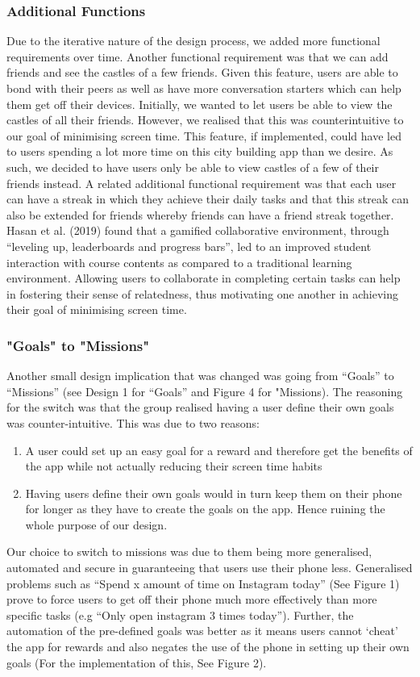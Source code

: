 \documentclass[sigconf, 11pt]{acmart}
\begin{document}
\subsubsection{Additional Functions}
Due to the iterative nature of the design process, we added more functional requirements over time. Another functional requirement was that we can add friends and see the castles of a few friends. Given this feature, users are able to bond with their peers as well as have more conversation starters which can help them get off their devices. Initially, we wanted to let users be able to view the castles of all their friends. However, we realised that this was counterintuitive to our goal of minimising screen time. This feature, if implemented, could have led to users spending a lot more time on this city building app than we desire. As such, we decided to have users only be able to view castles of a few of their friends instead. A related additional functional requirement was that each user can have a streak in which they achieve their daily tasks and that this streak can also be extended for friends whereby friends can have a friend streak together. Hasan et al. (2019) found that a gamified collaborative environment, through “leveling up, leaderboards and progress bars”, led to an improved student interaction with course contents as compared to a traditional learning environment. Allowing users to collaborate in completing certain tasks can help in fostering their sense of relatedness, thus motivating one another in achieving their goal of minimising screen time.
\\

\subsubsection{"Goals" to "Missions"}
Another small design implication that was changed was going from “Goals” to “Missions” (see Design 1 for “Goals” and Figure 4 for "Missions). The reasoning for the switch was that the group realised having a user define their own goals was counter-intuitive. This was due to two reasons:

\begin{enumerate}
    \item A user could set up an easy goal for a reward and therefore get the benefits of the app while not actually reducing their screen time habits
    \item Having users define their own goals would in turn keep them on their phone for longer as they have to create the goals on the app. Hence ruining the whole purpose of our design.
\end{enumerate}
Our choice to switch to missions was due to them being more generalised, automated and secure in guaranteeing that users use their phone less. Generalised problems such as “Spend x amount of time on Instagram today” (See Figure 1) prove to force users to get off their phone much more effectively than more specific tasks (e.g “Only open instagram 3 times today”). Further, the automation of the pre-defined goals was better as it means users cannot ‘cheat’ the app for rewards and also negates the use of the phone in setting up their own goals (For the implementation of this, See Figure 2).
\end{document}
